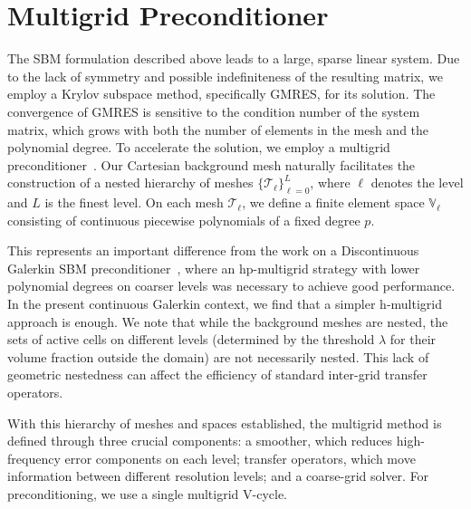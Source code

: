 \documentclass{elsarticle}
\begin{document}
\section{Multigrid Preconditioner}
\label{sec:mg_preconditioner}
The SBM formulation described above leads to a large, sparse linear system. Due to
the lack of symmetry and possible indefiniteness of the resulting matrix, we employ a Krylov subspace method,
specifically GMRES, for its solution. The convergence of GMRES is sensitive to the condition number of the system
matrix, which grows with both the number of elements in the mesh and the polynomial degree.
To accelerate the solution, we employ a multigrid preconditioner~\cite{hackbusch1985multi}. Our Cartesian
background mesh naturally facilitates the construction of a nested hierarchy of meshes
$\{\mathcal{T}_\ell\}_{\ell=0}^L$,
where $\ell$ denotes the level and $L$ is the finest level. On each mesh $\mathcal{T}_\ell$, we define a finite element
space $\mathbb{V}_\ell$ consisting of continuous piecewise polynomials of a fixed degree $p$.

This represents an important difference from the work on a Discontinuous Galerkin SBM
preconditioner~\cite{wichrowski2025geometric}, where an hp-multigrid strategy with lower polynomial degrees on coarser
levels was necessary to achieve good performance. In the present continuous Galerkin context, we find that a simpler
h-multigrid approach is enough. We note that while the background meshes are nested, the sets of active cells on
different levels (determined by the threshold $\lambda$ for their volume fraction outside the domain) are not
necessarily nested. This lack of geometric nestedness can affect the efficiency of standard inter-grid transfer
operators.

With this hierarchy of meshes and spaces established, the multigrid method is defined through three crucial components:
a smoother, which reduces high-frequency error components on each level; transfer operators, which move information
between different resolution levels; and a coarse-grid solver. For preconditioning, we use a single multigrid V-cycle.
\end{document}
